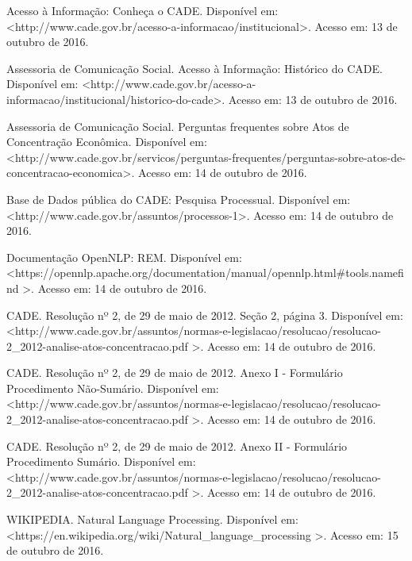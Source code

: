 \documentclass[11pt]{report}
\begin{document}
\begin{enumerate}[label={[\arabic*]}]
\item Acesso à Informação: Conheça o CADE. Disponível em: \textless\enspace http://www.cade.gov.br/acesso-a-informacao/institucional\enspace\textgreater. Acesso em: 13 de outubro de 2016.
\item Assessoria de Comunicação Social. Acesso à Informação: Histórico do CADE. Disponível em: \textless\enspace http://www.cade.gov.br/acesso-a-informacao/institucional/historico-do-cade\enspace\textgreater. Acesso em: 13 de outubro de 2016.
\item Assessoria de Comunicação Social. Perguntas frequentes sobre Atos de Concentração Econômica. Disponível em: \textless\enspace http://www.cade.gov.br/servicos/perguntas-frequentes/perguntas-sobre-atos-de-concentracao-economica\enspace\textgreater. Acesso em: 14 de outubro de 2016.
\item Base de Dados pública do CADE: Pesquisa Processual. Disponível em: \newline\textless\enspace http://www.cade.gov.br/assuntos/processos-1\enspace\textgreater. Acesso em: 14 de outubro de 2016.
\item Documentação OpenNLP: REM. Disponível em: \newline\textless\enspace https://opennlp.apache.org/documentation/manual/opennlp.html\#tools.namefind \enspace\textgreater. Acesso em: 14 de outubro de 2016.
\item CADE. Resolução nº 2, de 29 de maio de 2012. Seção 2, página 3. Disponível em: \textless\enspace http://www.cade.gov.br/assuntos/normas-e-legislacao/resolucao/resolucao-2\_2012-analise-atos-concentracao.pdf \enspace\textgreater. Acesso em: 14 de outubro de 2016.
\item CADE. Resolução nº 2, de 29 de maio de 2012. Anexo I - Formulário Procedimento Não-Sumário. Disponível em: \newline\textless\enspace http://www.cade.gov.br/assuntos/normas-e-legislacao/resolucao/resolucao-2\_2012-analise-atos-concentracao.pdf \enspace\textgreater. Acesso em: 14 de outubro de 2016.
\item CADE. Resolução nº 2, de 29 de maio de 2012. Anexo II - Formulário Procedimento Sumário. Disponível em: \newline\textless\enspace http://www.cade.gov.br/assuntos/normas-e-legislacao/resolucao/resolucao-2\_2012-analise-atos-concentracao.pdf \enspace\textgreater. Acesso em: 14 de outubro de 2016.
\item WIKIPEDIA. Natural Language Processing. Disponível em: \newline\textless\enspace https://en.wikipedia.org/wiki/Natural\_language\_processing \enspace\textgreater. Acesso em: 15 de outubro de 2016.

\end{enumerate}
\end{document}
